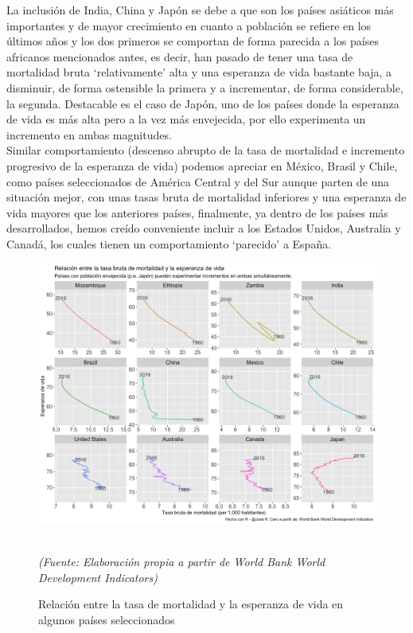La inclusión de India, China y Japón se debe a que son los países asiáticos más importantes y de mayor crecimiento en cuanto a  población se refiere en los últimos años y los dos primeros se comportan de forma parecida a los países africanos mencionados antes, es decir, han pasado de tener una tasa de mortalidad bruta `relativamente' alta y una esperanza de vida bastante baja, a disminuir, de forma ostensible la primera y a incrementar, de forma considerable, la segunda. Destacable es el caso de Japón, uno de los países donde la esperanza de vida es más alta pero a la vez más envejecida, por ello experimenta un incremento en ambas magnitudes.\\

Similar comportamiento (descenso abrupto de la tasa de mortalidad e incremento progresivo de la esperanza de vida) podemos apreciar en México, Brasil y Chile, como países seleccionados de América Central y del Sur aunque parten de una situación mejor, con unas tasas bruta de mortalidad inferiores y una esperanza de vida mayores que los anteriores países, finalmente, ya dentro de los países más desarrollados, hemos creído conveniente incluir a los Estados Unidos, Australia y Canadá, los cuales tienen un comportamiento `parecido' a España.


\newpage

\begin{figure}[!htp]
\centering
\hspace*{-1.3cm}
\includegraphics[scale=0.53]{Cap2/relactasaesp.png}
\captionsetup{width=1.1\linewidth}
\caption{Relaci\'on entre la tasa de mortalidad y la esperanza de vida en algunos países seleccionados}\\
\textit{(Fuente: Elaboración propia a partir de World Bank World Development Indicators)}
\end{figure}

